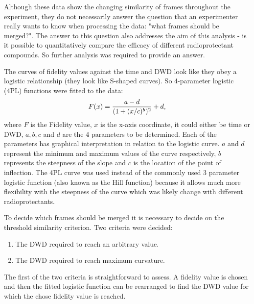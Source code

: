 Although these data show the changing similarity of frames throughout the experiment, they do not necessarily answer the question that an experimenter really wants to know when processing the data: "what frames should be merged?".
The answer to this question also addresses the aim of this analysis - is it possible to quantitatively compare the efficacy of different radioprotectant compounds.
So further analysis was required to provide an answer.

The curves of fidelity values against the time and DWD look like they obey a logistic relationship (they look like S-shaped curves).
So 4-parameter logistic (4PL) functions were fitted to the data:
\begin{equation}
    F(x) = \frac{a - d}{(1 + (x/c)^b)^2} + d,
    \label{eq:4PL}
\end{equation}
where $F$ is the Fidelity value, $x$ is the x-axis coordinate, it could either be time or DWD, $a, b, c$ and $d$ are the 4 parameters to be determined.
Each of the parameters has graphical interpretation in relation to the logistic curve.
$a$ and $d$ represent the minimum and maximum values of the curve respectively, $b$ represents the steepness of the slope and $c$ is the location of the point of inflection.
The 4PL curve was used instead of the commonly used 3 parameter logistic function (also known as the Hill function) because it allows much more flexibility with the steepness of the curve which was likely change with different radioprotectants.

To decide which frames should be merged it is necessary to decide on the threshold similarity criterion.
Two criteria were decided:
\begin{enumerate}
    \item The DWD required to reach an arbitrary value.
    \item The DWD required to reach maximum curvature.
\end{enumerate}
The first of the two criteria is straightforward to assess.
A fidelity value is chosen and then the fitted logistic function can be rearranged to find the DWD value for which the chose fidelity value is reached.

